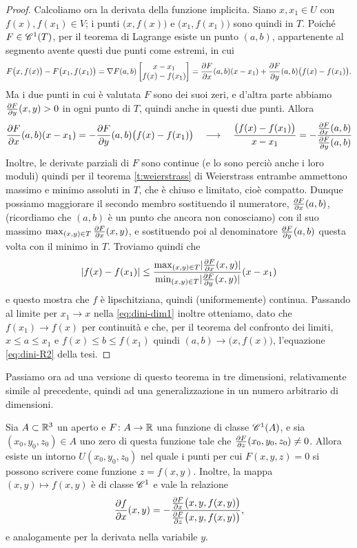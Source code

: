 \begin{proof}
	Calcoliamo ora la derivata della funzione implicita.
	Siano $x,x_1\in U$ con $f(x),f(x_1)\in V$; i punti $\big(x,f(x)\big)$ e $\big(x_1,f(x_1)\big)$ sono quindi in $T$.
	Poiché $F\in\cont[1]{T}$, per il teorema di Lagrange esiste un punto $(a,b)$, appartenente al segmento avente questi due punti come estremi, in cui
	\begin{equation}
		F\big(x,f(x)\big)-F\big(x_1,f(x_1)\big)=\grad F(a,b)
		\begin{bmatrix}
			x-x_1\\
			f(x)-f(x_1)
		\end{bmatrix}
		=\drp{F}{x}(a,b)(x-x_1)+\drp{F}{y}(a,b)\big(f(x)-f(x_1)\big).
	\end{equation}
	Ma i due punti in cui è valutata $F$ sono dei suoi zeri, e d'altra parte abbiamo $\drp{F}{y}(x,y)>0$ in ogni punto di $T$, quindi anche in questi due punti.
	Allora
	\begin{equation} \label{eq:dini-dim1}
		\drp{F}{x}(a,b)(x-x_1)=-\drp{F}{y}(a,b)\big(f(x)-f(x_1)\big)\qqq
		\frac{\big(f(x)-f(x_1)\big)}{x-x_1}=-\dfrac{\drp{F}{x}(a,b)}{\drp{F}{y}(a,b)}
	\end{equation}
	Inoltre, le derivate parziali di $F$ sono continue (e lo sono perciò anche i loro moduli) quindi per il teorema \ref{t:weierstrass} di Weierstrass entrambe ammettono massimo e minimo assoluti in $T$, che è chiuso e limitato, cioè compatto.
	Dunque possiamo maggiorare il secondo membro sostituendo il numeratore, $\drp{F}{x}(a,b)$, (ricordiamo che $(a,b)$ è un punto che ancora non conosciamo) con il suo massimo $\max_{(x,y)\in T}\drp{F}{x}(x,y)$, e sostituendo poi al denominatore $\drp{F}{y}(a,b)$ questa volta con il minimo in $T$.
	Troviamo quindi che
	\begin{equation}
		\abs{f(x)-f(x_1)}\leq\frac{\max_{(x,y)\in T}\abs{\drp{F}{x}(x,y)}}{\min_{(x,y)\in T}\abs{\drp{F}{y}(x,y)}}(x-x_1)
	\end{equation}
	e questo mostra che $f$ è lipschitziana, quindi (uniformemente) continua.
	Passando al limite per $x_1\to x$ nella \eqref{eq:dini-dim1} inoltre otteniamo, dato che $f(x_1)\to f(x)$ per continuità e che, per il teorema del confronto dei limiti, $x\leq a\leq x_1$ e $f(x)\leq b\leq f(x_1)$ quindi $(a,b)\to\big(x,f(x)\big)$, l'equazione \eqref{eq:dini-R2} della tesi.
\end{proof}
Passiamo ora ad una versione di questo teorema in tre dimensioni, relativamente simile al precedente, quindi ad una generalizzazione in un numero arbitrario di dimensioni.
\begin{teorema} \label{t:dini-R3}
	Sia $A\subset\R^3$ un aperto e $F\colon A\to\R$ una funzione di classe $\cont[1]{A}$, e sia $(x_0,y_0,z_0)\in A$ uno zero di questa funzione tale che $\drp{F}{z}(x_0,y_0,z_0)\neq 0$.
	Allora esiste un intorno $U(x_0,y_0,z_0)$ nel quale i punti per cui $F(x,y,z)=0$ si possono scrivere come funzione $z=f(x,y)$.
	Inoltre, la mappa $(x,y)\mapsto f(x,y)$ è di classe $\cclass[1]$ e vale la relazione
	\begin{equation}
		\drp{f}{x}(x,y)=-\dfrac{\drp{F}{x}\big(x,y,f(x,y)\big)}{\drp{F}{z}\big(x,y,f(x,y)\big)},
	\label{eq:dini-R3}
\end{equation}
	e analogamente per la derivata nella variabile $y$.
\end{teorema}

